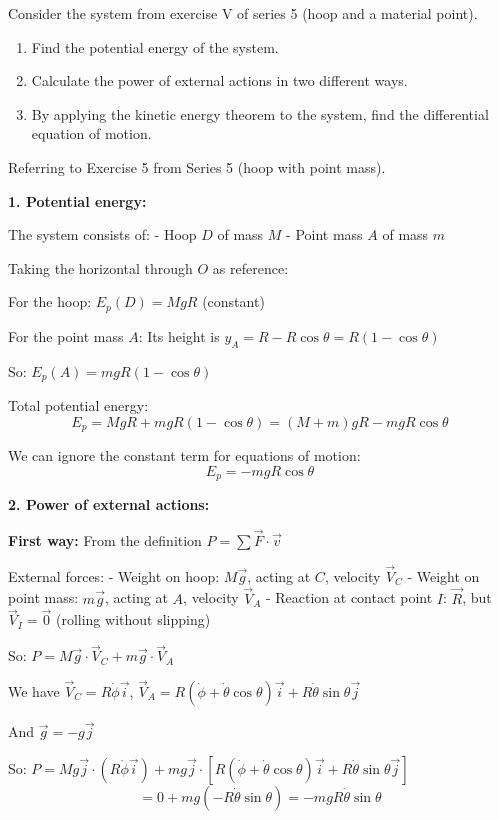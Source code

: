 \documentclass[12pt]{article}
\begin{document}
Consider the system from exercise V of series 5 (hoop and a material point).

\begin{enumerate}
    \item Find the potential energy of the system.
    \item Calculate the power of external actions in two different ways.
    \item By applying the kinetic energy theorem to the system, find the differential equation of motion.
\end{enumerate}

\begin{correctionbox}
Referring to Exercise 5 from Series 5 (hoop with point mass).

\textbf{1. Potential energy:}

The system consists of:
- Hoop $D$ of mass $M$
- Point mass $A$ of mass $m$

Taking the horizontal through $O$ as reference:

For the hoop: $E_p(D) = MgR$ (constant)

For the point mass $A$: Its height is $y_A = R - R\cos\theta = R(1 - \cos\theta)$

So: $E_p(A) = mgR(1 - \cos\theta)$

Total potential energy:
$$E_p = MgR + mgR(1 - \cos\theta) = (M + m)gR - mgR\cos\theta$$

We can ignore the constant term for equations of motion:
$$E_p = -mgR\cos\theta$$

\textbf{2. Power of external actions:}

\textbf{First way:} From the definition $P = \sum \vec{F} \cdot \vec{v}$

External forces:
- Weight on hoop: $M\vec{g}$, acting at $C$, velocity $\vec{V}_C$
- Weight on point mass: $m\vec{g}$, acting at $A$, velocity $\vec{V}_A$
- Reaction at contact point $I$: $\vec{R}$, but $\vec{V}_I = \vec{0}$ (rolling without slipping)

So: $P = M\vec{g} \cdot \vec{V}_C + m\vec{g} \cdot \vec{V}_A$

We have $\vec{V}_C = R\dot{\phi}\vec{i}$, $\vec{V}_A = R(\dot{\phi} + \dot{\theta}\cos\theta)\vec{i} + R\dot{\theta}\sin\theta\vec{j}$

And $\vec{g} = -g\vec{j}$

So: $P = Mg\vec{j} \cdot (R\dot{\phi}\vec{i}) + mg\vec{j} \cdot [R(\dot{\phi} + \dot{\theta}\cos\theta)\vec{i} + R\dot{\theta}\sin\theta\vec{j}]$
$$= 0 + mg(-R\dot{\theta}\sin\theta) = -mgR\dot{\theta}\sin\theta$$


\end{correctionbox}
\end{document}
